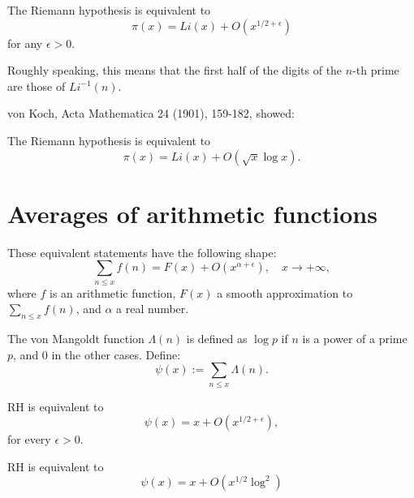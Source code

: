 \documentclass[12pt,letterpaper, reqno]{aimpl}
\begin{document}
\begin{problemblock}
\begin{rhequivalence}[1.1] The Riemann hypothesis is equivalent to
$$
\pi(x) = Li(x) + O(x^{1/2 + \epsilon})
$$
for any $\epsilon > 0$.
\end{rhequivalence}

Roughly speaking, this means that the first half of the digits of the
$n$-th prime are those of $Li^{-1}(n)$.

\end{problemblock}

\begin{problemblock}
von Koch, Acta Mathematica 24 (1901), 159-182, showed:
\begin{rhequivalence}[1.15] The Riemann hypothesis is equivalent to
$$
\pi(x) = Li(x) + O( \sqrt{x} \log x).
$$
\end{rhequivalence}

\end{problemblock}

\section{Averages of arithmetic functions}
These equivalent statements have the following shape:
$$
\sum_{n \leq x} f(n) = F(x) + O(x^{\alpha + \epsilon}), \quad x \rightarrow +\infty,
$$
where $f$ is an arithmetic function, $F(x)$ a smooth approximation to $\sum_{n \leq x} f(n)$, and $\alpha$ a real number.

\begin{problemblock}

The von Mangoldt function $\Lambda (n)$ is defined
as $\log p$ if $n$ is a power of a prime $p$, and $0$ in the other cases. Define:
$$
\psi(x) := \sum_{n \leq x} \Lambda (n).
$$

\begin{rhequivalence}[2.1]
RH is equivalent to
$$
\psi (x) =x + O(x^{1/2 + \epsilon}),
$$
for every $\epsilon>0$.
\end{rhequivalence}
\end{problemblock}

\begin{rhequiv}[2.13]\label{equiv:psilog2}
RH is equivalent to
$$
\psi (x) =x + O(x^{1/2}\log^2 )
$$
\end{rhequiv}
\end{document}
